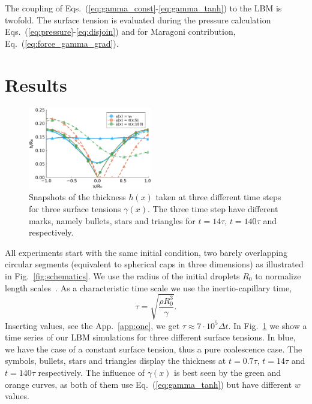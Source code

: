 \documentclass[twocolumn,amsmath,amssymb,showpacs,pre,nofootinbib,superscriptaddress]{revtex4-1} %
\begin{document}
The coupling of Eqs.~(\ref{eq:gamma_const}-\ref{eq:gamma_tanh}) to the LBM is twofold.
The surface tension is evaluated during the pressure calculation Eqs.~(\ref{eq:pressure}-\ref{eq:disjoin}) and for Maragoni contribution, Eq.~(\ref{eq:force_gamma_grad}).

\section{Results}\label{sec:results}
\begin{figure}
    \centering
    \includegraphics[width=0.48\textwidth]{Figures/evo_three_times.pdf}
    \caption{Snapshots of the thickness $h(x)$ taken at three different time steps for three surface tensions $\gamma(x)$.
    The three time step have different marks, namely bullets, stars and triangles for $t=14\tau$, $t=140\tau$ and respectively.}
    \label{fig:final_state}
\end{figure}
All experiments start with the same initial condition, two barely overlapping circular segments (equivalent to spherical caps in three dimensions) as illustrated in Fig.~\ref{fig:schematics}.
We use the radius of the initial droplets $R_0$ to normalize length scales~\cite{PhysRevLett.111.144502, PhysRevLett.95.164503}.
As a characteristic time scale we use the inertio-capillary time, 
\begin{equation}\label{eq:inertio-cap-time}
    \tau = \sqrt{\frac{\rho R_0^3}{\gamma}}.
\end{equation}
Inserting values, see the App.~\ref{app:one}, we get $\tau \approx 7\cdot 10^5 \Delta t$. 
In Fig.~\ref{fig:final_state} we show a time series of our LBM simulations for three different surface tensions.
In blue, we have the case of a constant surface tension, thus a pure coalescence case.
The symbols, bullets, stars and triangles display the thickness at $t=0.7\tau$, $t=14\tau$ and $t=140\tau$ respectively. 
The influence of $\gamma(x)$ is best seen by the green and orange curves, as both of them use Eq.~(\ref{eq:gamma_tanh}) but have different $w$ values.
\end{document}
